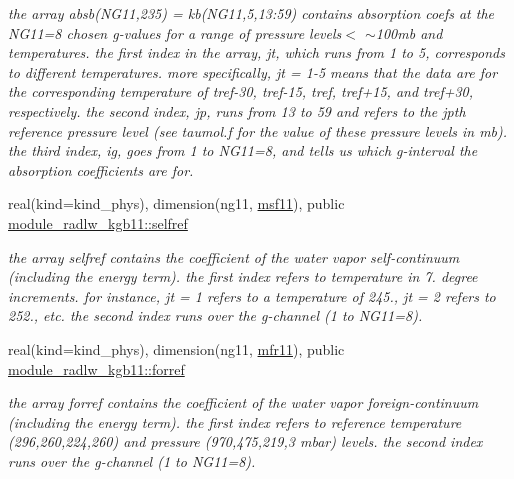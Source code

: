 \begin{DoxyCompactItemize}
\begin{DoxyCompactList}\small\item\em the array absb(\+N\+G11,235) = kb(\+N\+G11,5,13\+:59) contains absorption coefs at the N\+G11=8 chosen g-\/values for a range of pressure levels$<$ $\sim$100mb and temperatures. the first index in the array, jt, which runs from 1 to 5, corresponds to different temperatures. more specifically, jt = 1-\/5 means that the data are for the corresponding temperature of tref-\/30, tref-\/15, tref, tref+15, and tref+30, respectively. the second index, jp, runs from 13 to 59 and refers to the jpth reference pressure level (see taumol.\+f for the value of these pressure levels in mb). the third index, ig, goes from 1 to N\+G11=8, and tells us which g-\/interval the absorption coefficients are for. \end{DoxyCompactList}\item 
\mbox{\label{group__module__radlw__kgbnn_gac98edefcce668d56c3aadc241863741f}} 
real(kind=kind\+\_\+phys), dimension(ng11, \hyperlink{group__module__radlw__kgbnn_ga7dcec9b9f19a3f5f13d443572d834628}{msf11}), public \hyperlink{group__module__radlw__kgbnn_gac98edefcce668d56c3aadc241863741f}{module\+\_\+radlw\+\_\+kgb11\+::selfref}
\begin{DoxyCompactList}\small\item\em the array selfref contains the coefficient of the water vapor self-\/continuum (including the energy term). the first index refers to temperature in 7. degree increments. for instance, jt = 1 refers to a temperature of 245., jt = 2 refers to 252., etc. the second index runs over the g-\/channel (1 to N\+G11=8). \end{DoxyCompactList}\item 
\mbox{\label{group__module__radlw__kgbnn_ga9239d06fcd3fca0f13302c1ae4eb5a60}} 
real(kind=kind\+\_\+phys), dimension(ng11, \hyperlink{group__module__radlw__kgbnn_ga9b5764441999cce52bc02e65a24420b9}{mfr11}), public \hyperlink{group__module__radlw__kgbnn_ga9239d06fcd3fca0f13302c1ae4eb5a60}{module\+\_\+radlw\+\_\+kgb11\+::forref}
\begin{DoxyCompactList}\small\item\em the array forref contains the coefficient of the water vapor foreign-\/continuum (including the energy term). the first index refers to reference temperature (296,260,224,260) and pressure (970,475,219,3 mbar) levels. the second index runs over the g-\/channel (1 to N\+G11=8). \end{DoxyCompactList}\item 

\end{DoxyCompactItemize}
